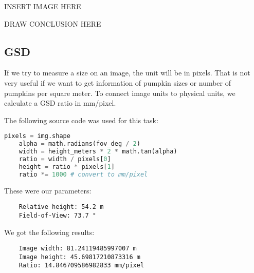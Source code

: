 \documentclass[../Head/Main.tex]{subfiles}
\begin{document}
INSERT IMAGE HERE

DRAW CONCLUSION HERE

\subsection{GSD}\label{subsec:gsd}

If we try to measure a size on an image, the unit will be in pixels. That is not very useful if we want to get information of pumpkin sizes or number of pumpkins per square meter. To connect image units to physical units, we calculate a GSD ratio in mm/pixel.

The following source code was used for this task:

\begin{lstlisting}[language=Python]
    pixels = img.shape
    alpha = math.radians(fov_deg / 2)
    width = height_meters * 2 * math.tan(alpha)
    ratio = width / pixels[0]
    height = ratio * pixels[1]
    ratio *= 1000 # convert to mm/pixel
\end{lstlisting}

These were our parameters:

\begin{verbatim}
    Relative height: 54.2 m
    Field-of-View: 73.7 °
\end{verbatim}


We got the following results:

\begin{verbatim}
    Image width: 81.24119485997007 m
    Image height: 45.69817210873316 m
    Ratio: 14.846709586982833 mm/pixel
\end{verbatim}
\end{document}

